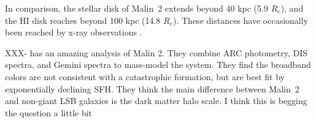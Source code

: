 \documentclass[12pt,preprint]{aastex}
\newcommand\msun{\rm{M}_\odot}
\newcommand\HI{\ion{H}{1}}
\begin{document}
In comparison, the stellar disk of Malin~2 extends beyond 40 kpc (5.9 $R_e$), and the HI disk reaches beyond 100 kpc (14.8 $R_e$).  These distances have occasionally been reached by x-ray observations \citep{Buote12}. 







XXX-\citet{Kasparova14} has an amazing analysis of Malin 2.  They combine ARC photometry, DIS spectra, and Gemini spectra to mass-model the system.  They find the broadband colors are not consistent with a catastrophic formation, but are best fit by exponentially declining SFH.  They think the main difference between Malin~2 and non-giant LSB galaxies is the dark matter halo scale.  I think this is begging the question a little bit 




\end{document}
